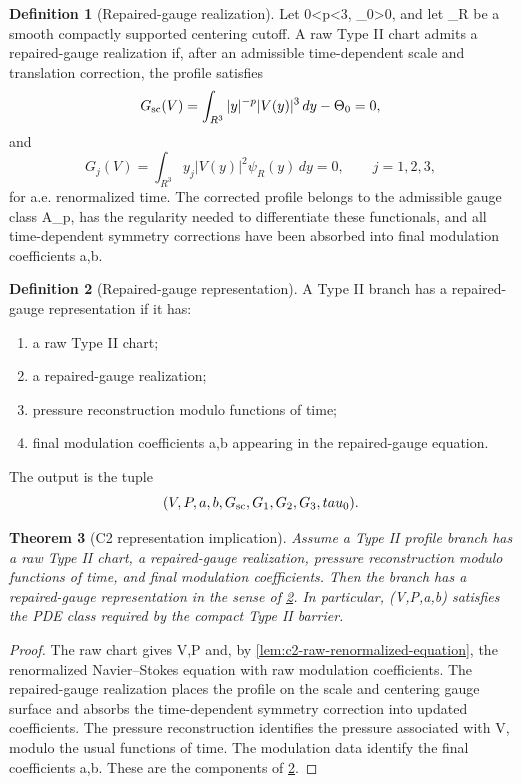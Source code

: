 \documentclass[11pt]{amsart}
\def\({}%
\def\){}%
\def\mathbb#1{#1}%
\def\tau{tau}%
\theoremstyle{plain}
\newtheorem{theorem}{Theorem}[section]
\theoremstyle{definition}
\newtheorem{definition}[theorem]{Definition}
\theoremstyle{remark}
\begin{document}
\begin{definition}[Repaired-gauge realization]
\label{def:c2-repaired-gauge-realization}
Let \(0<p<3\), \(\Theta_0>0\), and let \(\psi_R\) be a smooth compactly
supported centering cutoff.  A raw Type II chart admits a repaired-gauge
realization if, after an admissible time-dependent scale and translation
correction, the profile satisfies
\[
  G_{\rm sc}(V)=\int_{\mathbb R^3}|y|^{-p}|V(y)|^3\,dy-\Theta_0=0,
\]
and
\[
  G_j(V)=\int_{\mathbb R^3}y_j|V(y)|^2\psi_R(y)\,dy=0,
  \qquad j=1,2,3,
\]
for a.e. renormalized time.  The corrected profile belongs to the admissible
gauge class \(\mathcal A_p\), has the regularity needed to differentiate these
functionals, and all time-dependent symmetry corrections have been absorbed
into final modulation coefficients \(a,b\).
\end{definition}

\begin{definition}[Repaired-gauge representation]
\label{def:c2-representation}
A Type II branch has a repaired-gauge representation if it has:
\begin{enumerate}[label=\textup{(\roman*)}]
\item a raw Type II chart;
\item a repaired-gauge realization;
\item pressure reconstruction modulo functions of time;
\item final modulation coefficients \(a,b\) appearing in the repaired-gauge
equation.
\end{enumerate}
The output is the tuple
\[
  (V,P,a,b,G_{\rm sc},G_1,G_2,G_3,\tau_0).
\]
\end{definition}

\begin{theorem}[C2 representation implication]
\label{thm:c2-representation-implication}
Assume a Type II profile branch has a raw Type II chart, a repaired-gauge
realization, pressure reconstruction modulo functions of time, and final
modulation coefficients.  Then the branch has a repaired-gauge representation
in the sense of \cref{def:c2-representation}.  In particular,
\((V,P,a,b)\) satisfies the PDE class required by the compact Type II barrier.
\end{theorem}

\begin{proof}
The raw chart gives \(V,P\) and, by \cref{lem:c2-raw-renormalized-equation},
the renormalized Navier--Stokes equation with raw modulation coefficients.  The
repaired-gauge realization places the profile on the scale and centering gauge
surface and absorbs the time-dependent symmetry correction into updated
coefficients.  The pressure reconstruction identifies the pressure associated
with \(V\), modulo the usual functions of time.  The modulation data identify
the final coefficients \(a,b\).  These are the components of
\cref{def:c2-representation}.
\end{proof}
\end{document}
